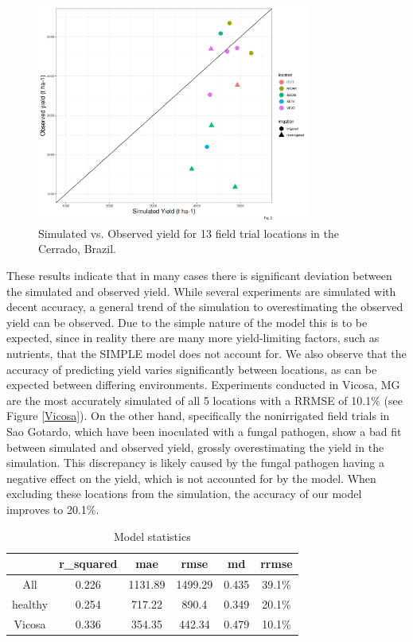 \documentclass[11pt]{article}
\begin{document}
\begin{figure}[htbp]
\centering
\includegraphics[width=0.8\textwidth]{../results/experimental-data/2023-02-18_Obs_Sim_all_415.png}
\caption{\label{obs-sim}Simulated vs. Observed yield for 13 field trial locations in the Cerrado, Brazil.}
\end{figure}

These results indicate that in many cases there is significant deviation between the simulated and observed yield. While several experiments are simulated with decent accuracy, a general trend of the simulation to overestimating the observed yield can be observed. Due to the simple nature of the model this is to be expected, since in reality there are many more yield-limiting factors, such as nutrients, that the SIMPLE model does not account for.
We also observe that the accuracy of predicting yield varies significantly between locations, as can be expected between differing environments. Experiments conducted in Vicosa, MG are the most accurately simulated of all 5 locations with a RRMSE of 10.1\% (see Figure \ref{Vicosa}).
On the other hand, specifically the nonirrigated field trials in Sao Gotardo, which  have been inoculated with a fungal pathogen, show a bad fit between simulated and observed yield, grossly overestimating the yield in the simulation. This discrepancy is likely caused by the fungal pathogen having a negative effect on the yield, which is not accounted for by the model. When excluding these locations from the simulation, the accuracy of our model improves to 20.1\%.

\begin{table}[htbp]
\caption{\label{stats}Model statistics}
\centering
\begin{tabular}{|c|c|c|c|c|c|}
\hline
 & r\_squared & mae & rmse & md & rrmse\\
\hline
All & 0.226 & 1131.89 & 1499.29 & 0.435 & 39.1\%\\
healthy & 0.254 & 717.22 & 890.4 & 0.349 & 20.1\%\\
Vicosa & 0.336 & 354.35 & 442.34 & 0.479 & 10.1\%\\
\hline
\end{tabular}
\end{table}
\end{document}
